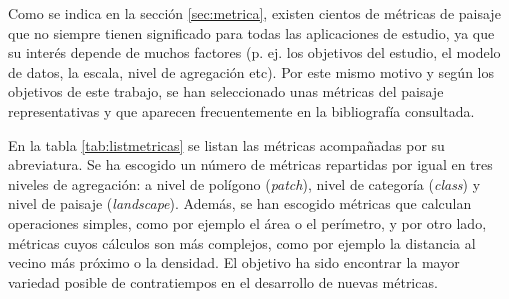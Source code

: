 Como se indica en la sección \ref{sec:metrica}, existen cientos de métricas de paisaje que no siempre tienen significado para todas las aplicaciones de estudio, ya que su interés depende de muchos factores (p. ej. los objetivos del estudio, el modelo de datos, la escala, nivel de agregación etc). Por este mismo motivo y según los objetivos de este trabajo, se han seleccionado unas métricas del paisaje representativas y que aparecen frecuentemente en la bibliografía consultada.

En la tabla \ref{tab:listmetricas} se listan las métricas acompañadas por su abreviatura. Se ha escogido un número de métricas repartidas por igual en tres niveles de agregación: a nivel de polígono (\textit{patch}), nivel de categoría (\textit{class}) y nivel de paisaje (\textit{landscape}). Además, se han escogido métricas que calculan operaciones simples, como por ejemplo el área o el perímetro, y por otro lado, métricas cuyos cálculos son más complejos, como por ejemplo la distancia al vecino más próximo o la densidad. El objetivo ha sido encontrar la mayor variedad posible de contratiempos en el desarrollo de nuevas métricas.

